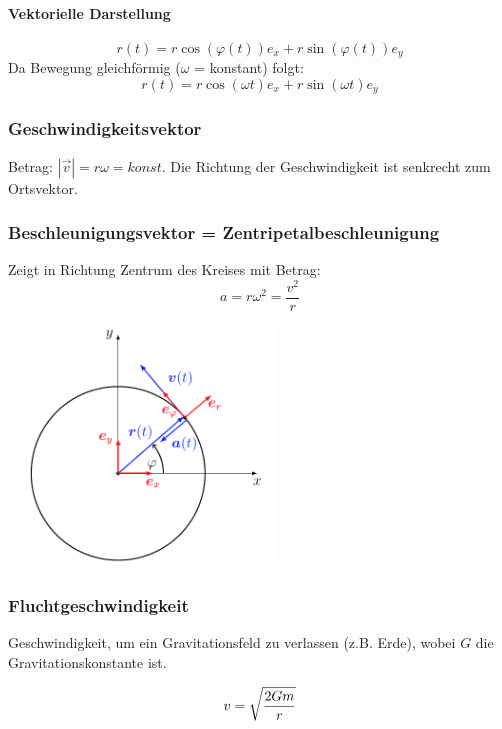 \documentclass[7pt]{article}
\begin{document}
\begin{multicols*}{3}
\paragraph{Vektorielle Darstellung}
\begin{equation*}
	r(t) = r \cos(\varphi(t))e_x + r \sin(\varphi(t))e_y
\end{equation*}
Da Bewegung gleichf{\"o}rmig ($\omega$ = konstant) folgt:
\begin{equation*}
	r(t) = r \cos(\omega t)e_x + r \sin(\omega t)e_y
\end{equation*}


\subsubsection{Geschwindigkeitsvektor}
Betrag: $|\vec{v}| = r \omega = konst.$ \newline
Die Richtung der Geschwindigkeit ist senkrecht zum Ortsvektor.

\subsubsection{Beschleunigungsvektor = Zentripetalbeschleunigung}
Zeigt in Richtung Zentrum des Kreises mit Betrag: 
\begin{equation*}
	a = r \omega ^2 = \frac{v^2}{r}
\end{equation*}

\begin{center}
	\includegraphics[width=200pt]{images/beschleunigung_radial}
\end{center}

\subsubsection{Fluchtgeschwindigkeit}

Geschwindigkeit, um ein Gravitationsfeld zu verlassen (z.B. Erde), wobei $G$ die Gravitationskonstante ist.

\begin{equation*}
	v = \sqrt{2Gm\over r}
\end{equation*}

\end{multicols*}
\end{document}

